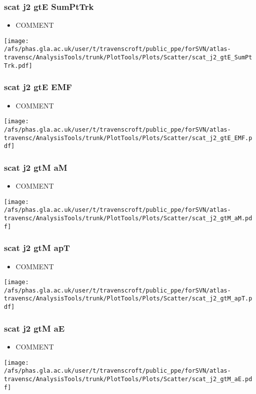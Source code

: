 \documentclass{beamer}
\begin{document}
\begin{frame}
\frametitle{scat j2 gtE SumPtTrk}
\begin{itemize}
\item COMMENT
\end{itemize}
\begin{center}
\texttt{[image: /afs/phas.gla.ac.uk/user/t/travenscroft/public\_ppe/forSVN/atlas-travensc/AnalysisTools/trunk/PlotTools/Plots/Scatter/scat\_j2\_gtE\_SumPtTrk.pdf]}
\end{center}
\end{frame}

\begin{frame}
\frametitle{scat j2 gtE EMF}
\begin{itemize}
\item COMMENT
\end{itemize}
\begin{center}
\texttt{[image: /afs/phas.gla.ac.uk/user/t/travenscroft/public\_ppe/forSVN/atlas-travensc/AnalysisTools/trunk/PlotTools/Plots/Scatter/scat\_j2\_gtE\_EMF.pdf]}
\end{center}
\end{frame}

\begin{frame}
\frametitle{scat j2 gtM aM}
\begin{itemize}
\item COMMENT
\end{itemize}
\begin{center}
\texttt{[image: /afs/phas.gla.ac.uk/user/t/travenscroft/public\_ppe/forSVN/atlas-travensc/AnalysisTools/trunk/PlotTools/Plots/Scatter/scat\_j2\_gtM\_aM.pdf]}
\end{center}
\end{frame}

\begin{frame}
\frametitle{scat j2 gtM apT}
\begin{itemize}
\item COMMENT
\end{itemize}
\begin{center}
\texttt{[image: /afs/phas.gla.ac.uk/user/t/travenscroft/public\_ppe/forSVN/atlas-travensc/AnalysisTools/trunk/PlotTools/Plots/Scatter/scat\_j2\_gtM\_apT.pdf]}
\end{center}
\end{frame}

\begin{frame}
\frametitle{scat j2 gtM aE}
\begin{itemize}
\item COMMENT
\end{itemize}
\begin{center}
\texttt{[image: /afs/phas.gla.ac.uk/user/t/travenscroft/public\_ppe/forSVN/atlas-travensc/AnalysisTools/trunk/PlotTools/Plots/Scatter/scat\_j2\_gtM\_aE.pdf]}
\end{center}
\end{frame}
\end{document}

